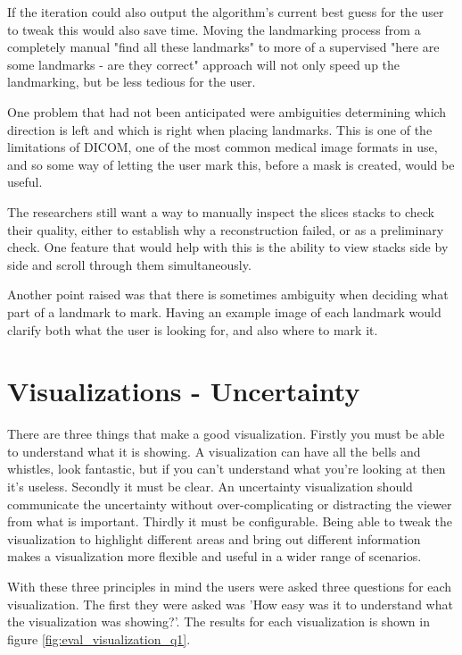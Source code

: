 If the iteration could also output the algorithm's current best guess for the user to tweak this would also save time. Moving the landmarking process from a completely manual "find all these landmarks" to more of a supervised "here are some landmarks - are they correct" approach will not only speed up the landmarking, but be less tedious for the user.

One problem that had not been anticipated were ambiguities determining which direction is left and which is right when placing landmarks. This is one of the limitations of DICOM, one of the most common medical image formats in use, and so some way of letting the user mark this, before a mask is created, would be useful.

The researchers still want a way to manually inspect the slices stacks to check their quality, either to establish why a reconstruction failed, or as a preliminary check. One feature that would help with this is the ability to view stacks side by side and scroll through them simultaneously.

Another point raised was that there is sometimes ambiguity when deciding what part of a landmark to mark. Having an example image of each landmark would clarify both what the user is looking for, and also where to mark it.

\newpage
\section{Visualizations - Uncertainty}
There are three things that make a good visualization. Firstly you must be able to understand what it is showing. A visualization can have all the bells and whistles, look fantastic, but if you can't understand what you're looking at then it's useless. Secondly it must be clear. An uncertainty visualization should communicate the uncertainty without over-complicating or distracting the viewer from what is important. Thirdly it must be configurable. Being able to tweak the visualization to highlight different areas and bring out different information makes a visualization more flexible and useful in a wider range of scenarios.

With these three principles in mind the users were asked three questions for each visualization. The first they were asked was 'How easy was it to understand what the visualization was showing?'. The results for each visualization is shown in figure \ref{fig:eval_visualization_q1}.

